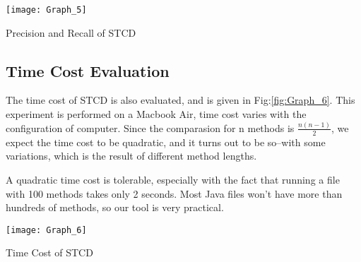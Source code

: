 \documentclass[../main.tex]{subfiles}
\begin{document}
\begin{figurehere}
\centering \texttt{[image: Graph\_5]} 
\caption{Precision and Recall of STCD} \label{fig:Graph_5}
\end{figurehere}

\subsection{Time Cost Evaluation}

The time cost of STCD is also evaluated, and is given in Fig:\ref{fig:Graph_6}. This experiment is performed on a Macbook Air, time cost varies with the configuration of computer. Since the comparasion for n methods is $\frac{n(n-1)}{2}$, we expect the time cost to be quadratic, and it turns out to be so--with some variations, which is the result of different method lengths.

A quadratic time cost is tolerable, especially with the fact that running a file with 100 methods takes only 2 seconds. Most Java files won't have more than hundreds of methods, so our tool is very practical.

\begin{figurehere}
\centering \texttt{[image: Graph\_6]} 
\caption{Time Cost of STCD} \label{fig:Graph_6}
\end{figurehere}
\end{document}

